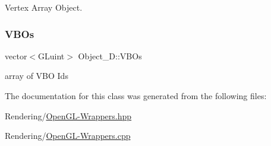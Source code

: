 Vertex Array Object. 

\mbox{\label{classObject__3D_acfd04c0df55218879d7d66ee91a22ea5}} 
\subsubsection{\texorpdfstring{V\+B\+Os}{VBOs}}
{\footnotesize\ttfamily vector$<$G\+Luint$>$ Object\+\_\+D\+::\+V\+B\+Os}



array of V\+BO Ids 



The documentation for this class was generated from the following files\+:\begin{DoxyCompactItemize}
\item 
Rendering/\mbox{\hyperlink{OpenGL-Wrappers_8hpp}{Open\+G\+L-\/\+Wrappers.\+hpp}}\item 
Rendering/\mbox{\hyperlink{OpenGL-Wrappers_8cpp}{Open\+G\+L-\/\+Wrappers.\+cpp}}\end{DoxyCompactItemize}
